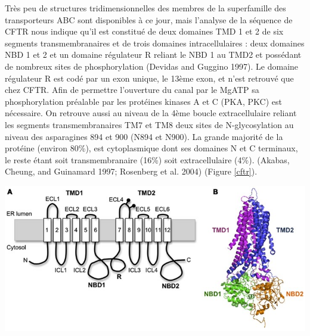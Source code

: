 Très peu de structures tridimensionnelles des membres de la superfamille des transporteurs ABC sont disponibles à ce jour, mais l’analyse de la séquence de CFTR nous indique qu’il est constitué de deux domaines TMD 1 et 2 de six segments transmembranaires et de trois domaines intracellulaires : deux domaines NBD 1 et 2 et un domaine régulateur R reliant le NBD 1 au TMD2 et possédant de nombreux sites de phosphorylation (Devidas and Guggino 1997)\cite{devidas_cftr:_1997}. Le domaine régulateur R est codé par un exon unique, le 13ème exon, et n’est retrouvé que chez CFTR. Afin de permettre l’ouverture du canal par le MgATP sa phosphorylation préalable par les protéines kinases A et C (PKA, PKC) est nécessaire. On retrouve aussi au niveau de la 4ème boucle extracellulaire reliant les segments transmembranaires TM7 et TM8 deux sites de N-glycosylation au niveau des asparagines 894 et 900 (N894 et N900). La grande majorité de la protéine (environ 80\%), est cytoplasmique dont ses domaines N et C terminaux, le reste étant soit transmembranaire (16\%) soit extracellulaire (4\%). (Akabas, Cheung, and Guinamard 1997; Rosenberg et al. 2004)\cite{akabas_probing_1997}\cite{rosenberg_purification_2004} (Figure \ref{cftr}).
\begin{center}
\includegraphics[scale=2]{gfx/CFTR.jpg} 
       \label{cftr}
\end{center}

